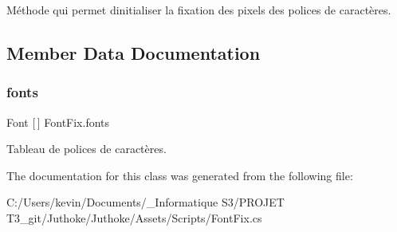 Méthode qui permet d\textquotesingle{}initialiser la fixation des pixels des polices de caractères. 

\subsection{Member Data Documentation}
\mbox{\label{class_font_fix_a946dd8dae881f5d750fbcc49760b1641}} 
\subsubsection{\texorpdfstring{fonts}{fonts}}
{\footnotesize\ttfamily Font \mbox{[}$\,$\mbox{]} Font\+Fix.\+fonts}

Tableau de polices de caractères. 

The documentation for this class was generated from the following file\+:\begin{DoxyCompactItemize}
\item 
C\+:/\+Users/kevin/\+Documents/\+\_\+\+Informatique S3/\+P\+R\+O\+J\+E\+T T3\+\_\+git/\+Juthoke/\+Juthoke/\+Assets/\+Scripts/Font\+Fix.\+cs\end{DoxyCompactItemize}
